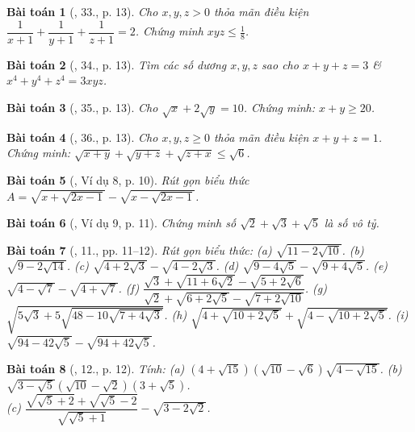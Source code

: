 \documentclass{article}
\newtheorem{baitoan}{Bài toán}
\begin{document}
\begin{baitoan}[\cite{Tuyen_Toan_9}, 33., p. 13]
	Cho $x,y,z > 0$ thỏa mãn điều kiện $\dfrac{1}{x + 1} + \dfrac{1}{y + 1} + \dfrac{1}{z + 1} = 2$. Chứng minh $xyz\le\frac{1}{8}$.
\end{baitoan}

\begin{baitoan}[\cite{Tuyen_Toan_9}, 34., p. 13]
	Tìm các số dương $x,y,z$ sao cho $x + y + z = 3$ \& $x^4 + y^4 + z^4 = 3xyz$.
\end{baitoan}

\begin{baitoan}[\cite{Tuyen_Toan_9}, 35., p. 13]
	Cho $\sqrt{x} + 2\sqrt{y} = 10$. Chứng minh: $x + y\ge20$.
\end{baitoan}

\begin{baitoan}[\cite{Tuyen_Toan_9}, 36., p. 13]
	Cho $x,y,z\ge0$ thỏa mãn điều kiện $x + y + z = 1$. Chứng minh: $\sqrt{x + y} + \sqrt{y + z} + \sqrt{z + x}\le\sqrt{6}$.
\end{baitoan}

\begin{baitoan}[\cite{Binh_Toan_9_tap_1}, Ví dụ 8, p. 10]
	Rút gọn biểu thức $A = \sqrt{x + \sqrt{2x - 1}} - \sqrt{ x - \sqrt{2x - 1}}$.
\end{baitoan}

\begin{baitoan}[\cite{Binh_Toan_9_tap_1}, Ví dụ 9, p. 11]
	Chứng minh số $\sqrt{2} + \sqrt{3} + \sqrt{5}$ là số vô tỷ.
\end{baitoan}

\begin{baitoan}[\cite{Binh_Toan_9_tap_1}, 11., pp. 11--12]
	Rút gọn biểu thức: (a) $\sqrt{11 - 2\sqrt{10}}$. (b) $\sqrt{9 - 2\sqrt{14}}$. (c) $\sqrt{4 + 2\sqrt{3}} - \sqrt{4 - 2\sqrt{3}}$. (d) $\sqrt{9 - 4\sqrt{5}} - \sqrt{9 + 4\sqrt{5}}$. (e) $\sqrt{4 - \sqrt{7}} - \sqrt{4 + \sqrt{7}}$. (f) $\dfrac{\sqrt{3} + \sqrt{11 + 6\sqrt{2}}- \sqrt{5 + 2\sqrt{6}}}{\sqrt{2} + \sqrt{6 + 2\sqrt{5}} - \sqrt{7 + 2\sqrt{10}}}$. (g) $\sqrt{5\sqrt{3} + 5\sqrt{48 - 10\sqrt{7+ 4\sqrt{3}}}}$. (h) $\sqrt{4 + \sqrt{10 + 2\sqrt{5}}} + \sqrt{4 - \sqrt{10 + 2\sqrt{5}}}$. (i) $\sqrt{94 - 42\sqrt{5}} - \sqrt{94 + 42\sqrt{5}}$.
\end{baitoan}

\begin{baitoan}[\cite{Binh_Toan_9_tap_1}, 12., p. 12]
	Tính: (a) $(4 + \sqrt{15})(\sqrt{10} - \sqrt{6})\sqrt{4 - \sqrt{15}}$. (b) $\sqrt{3 - \sqrt{5}}(\sqrt{10} - \sqrt{2})(3 + \sqrt{5})$.\\(c) $\dfrac{\sqrt{\sqrt{5} + 2} + \sqrt{\sqrt{5} - 2}}{\sqrt{\sqrt{5} + 1}} - \sqrt{3 - 2\sqrt{2}}$.
\end{baitoan}
\end{document}
